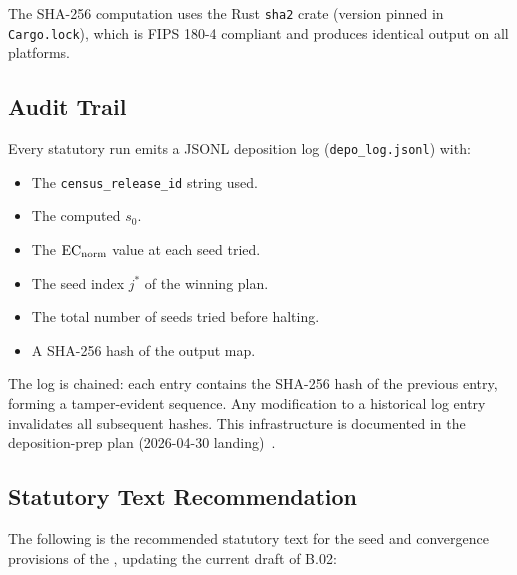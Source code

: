 The SHA-256 computation uses the Rust \texttt{sha2} crate (version pinned in
\texttt{Cargo.lock}), which is FIPS 180-4 compliant and produces identical
output on all platforms.

\subsection{Audit Trail}

Every statutory \cs{} run emits a JSONL deposition log
(\texttt{depo\_log.jsonl}) with:
\begin{itemize}
\item The \texttt{census\_release\_id} string used.
\item The computed $s_0$.
\item The $\mathrm{EC}_{\mathrm{norm}}$ value at each seed tried.
\item The seed index $j^*$ of the winning plan.
\item The total number of seeds tried before halting.
\item A SHA-256 hash of the output map.
\end{itemize}

The log is chained: each entry contains the SHA-256 hash of the previous
entry, forming a tamper-evident sequence.
Any modification to a historical log entry invalidates all subsequent hashes.
This infrastructure is documented in the deposition-prep plan
(2026-04-30 landing)~\citep{depoplan}.

\subsection{Statutory Text Recommendation}

The following is the recommended statutory text for the seed and convergence
provisions of the \dia{}, updating the current draft of B.02:

